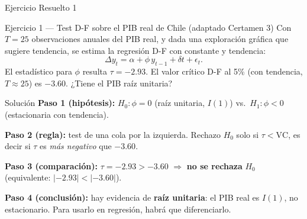 \documentclass{beamer}
\begin{document}
\begin{frame}{Ejercicio Resuelto 1}

\begin{block}{Ejercicio 1 --- Test D-F sobre el PIB real de Chile (adaptado Certamen 3)}
Con $T=25$ observaciones anuales del PIB real, y dada una exploración gráfica que sugiere tendencia, se estima la regresión D-F con constante y tendencia:
\[
\Delta y_t = \alpha + \phi\, y_{t-1} + \delta t + \epsilon_t.
\]
El estadístico para $\phi$ resulta $\tau = -2.93$. El valor crítico D-F al 5\% (con tendencia, $T\approx 25$) es $-3.60$. ¿Tiene el PIB raíz unitaria?
\end{block}

\pause

\begin{exampleblock}{Solución}
\textbf{Paso 1 (hipótesis):} $H_0:\phi=0$ (raíz unitaria, $I(1)$) vs.\ $H_1:\phi<0$ (estacionaria con tendencia).

\textbf{Paso 2 (regla):} test de una cola por la izquierda. Rechazo $H_0$ solo si $\tau < \text{VC}$, es decir si $\tau$ es \emph{más negativo} que $-3.60$.

\textbf{Paso 3 (comparación):} $\tau=-2.93 > -3.60$ $\Rightarrow$ \textbf{no se rechaza} $H_0$ (equivalente: $|-2.93|<|-3.60|$).

\textbf{Paso 4 (conclusión):} hay evidencia de \textbf{raíz unitaria}: el PIB real es $I(1)$, no estacionario. Para usarlo en regresión, habrá que diferenciarlo.
\end{exampleblock}

\end{frame}
\end{document}
